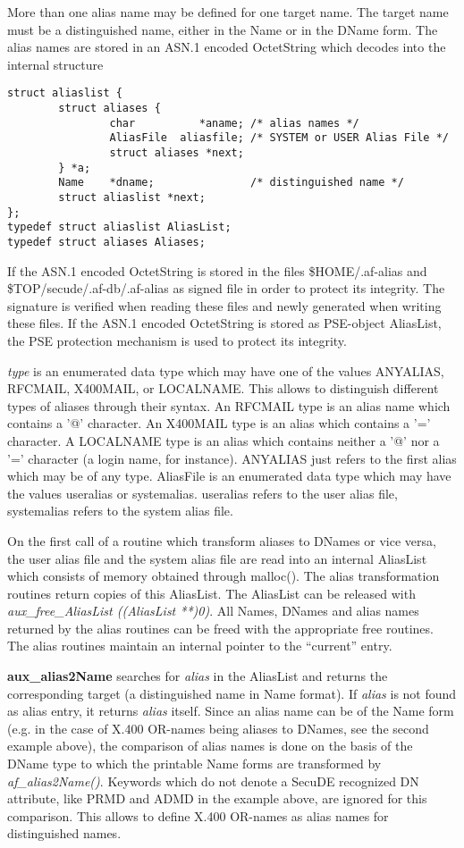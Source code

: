 More than one alias name may be defined for one target name. The target name must be a
distinguished name, either in the Name or in the DName form. The alias names are
stored in an ASN.1 encoded OctetString which decodes into the internal structure
\begin{verbatim}
struct aliaslist {
        struct aliases {
                char          *aname; /* alias names */
                AliasFile  aliasfile; /* SYSTEM or USER Alias File */
                struct aliases *next;
        } *a;
        Name    *dname;               /* distinguished name */
        struct aliaslist *next;
};
typedef struct aliaslist AliasList;
typedef struct aliases Aliases;
\end{verbatim}
If the ASN.1 encoded OctetString is stored in the files \$HOME/.af-alias and \$TOP/secude/.af-db/.af-alias as signed file in order to protect its integrity.
The signature is verified when reading these files and newly generated when
writing these files. If the ASN.1 encoded OctetString is stored as PSE-object
AliasList, the PSE protection mechanism is used to protect its integrity.

{\em type} is an enumerated data type which may have one
of the values ANYALIAS, RFCMAIL, X400MAIL, or LOCALNAME. This allows to distinguish
different types of aliases through their syntax. An RFCMAIL type is an alias name which
contains a '@' character. An X400MAIL type is an alias which contains a '=' character.
A LOCALNAME type is an alias which contains neither a '@' nor a '=' character (a login
name, for instance).
ANYALIAS just refers to the first alias which may be of any type.
AliasFile is an enumerated data type which may have the values useralias
or systemalias. useralias refers to the user alias file, systemalias refers
to the system alias file.

On the first call of a routine which transform aliases to DNames or vice versa, the user 
alias file and the system alias file are read into an internal AliasList which
consists of memory obtained through malloc(). The alias transformation
routines return copies of this AliasList. The AliasList can be released
with {\em aux\_free\_AliasList ((AliasList **)0)}. All Names, DNames and alias names returned by 
the alias routines can be freed with the appropriate free routines. The alias routines 
maintain an internal pointer to the ``current'' entry.  

{\bf aux\_alias2Name} searches for {\em alias} in the AliasList
and returns the corresponding target
(a distinguished name in Name format). If {\em alias}
is not found as alias entry, it returns {\em alias} itself. Since an alias name can be
of the Name form (e.g. in the case of X.400 OR-names being aliases to DNames, see the second 
example above), the comparison of alias names is done on the basis of the DName type to which
the printable Name forms are transformed by {\em af\_alias2Name()}.
Keywords which do not
denote a SecuDE recognized DN attribute, like PRMD and ADMD in the example above,
are ignored for this comparison. This allows to define X.400 OR-names as alias names
for distinguished names.

